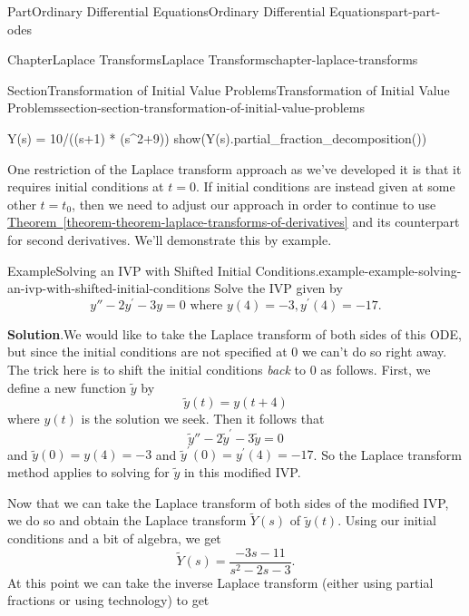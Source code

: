 \documentclass[twoside,10pt,]{book}
\newcommand{\blocktitlefont}{\relax}
\newcommand{\xreffont}{\relax}
\numberwithin{equation}{part}
\begin{document}
\begin{partptx}{Part}{Ordinary Differential Equations}{}{Ordinary Differential Equations}{}{}{part-part-odes}
\begin{chapterptx}{Chapter}{Laplace Transforms}{}{Laplace Transforms}{}{}{chapter-laplace-transforms}
\begin{sectionptx}{Section}{Transformation of Initial Value Problems}{}{Transformation of Initial Value Problems}{}{}{section-section-transformation-of-initial-value-problems}
\begin{sageinput}
Y(s) = 10/((s+1) * (s^2+9))
show(Y(s).partial_fraction_decomposition())
\end{sageinput}
One restriction of the Laplace transform approach as we've developed it is that it requires initial conditions at \(t=0\). If initial conditions are instead given at some other \(t=t_0\), then we need to adjust our approach in order to continue to use \hyperref[theorem-theorem-laplace-transforms-of-derivatives]{Theorem~{\xreffont\ref{theorem-theorem-laplace-transforms-of-derivatives}}} and its counterpart for second derivatives. We'll demonstrate this by example.%
\begin{example}{Example}{Solving an IVP with Shifted Initial Conditions.}{example-example-solving-an-ivp-with-shifted-initial-conditions}%
Solve the IVP given by%
\begin{equation*}
y'' - 2y^\prime - 3y = 0\text{ where }y(4) = -3, y^\prime(4) = -17.
\end{equation*}
%
\par\smallskip%
\noindent\textbf{\blocktitlefont Solution}.\hypertarget{solution-example-solving-an-ivp-with-shifted-initial-conditions-c}{}\quad{}We would like to take the Laplace transform of both sides of this ODE, but since the initial conditions are not specified at \(0\) we can't do so right away. The trick here is to shift the initial conditions \emph{back} to \(0\) as follows. First, we define a new function \(\widetilde{y}\) by%
\begin{equation*}
\widetilde{y}(t) = y(t+4)
\end{equation*}
where \(y(t)\) is the solution we seek. Then it follows that%
\begin{equation*}
\widetilde{y}'' - 2\widetilde{y}^\prime - 3\widetilde{y} = 0
\end{equation*}
and \(\widetilde{y}(0) = y(4) = -3\) and \(\widetilde{y}^\prime(0) = y^\prime(4) = -17\). So the Laplace transform method applies to solving for \(\widetilde{y}\) in this modified IVP.%
\par
Now that we can take the Laplace transform of both sides of the modified IVP, we do so and obtain the Laplace transform \(\widetilde{Y}(s)\) of \(\widetilde{y}(t)\). Using our initial conditions and a bit of algebra, we get%
\begin{equation*}
\widetilde{Y}(s) = \frac{-3s-11}{s^2-2s-3}.
\end{equation*}
At this point we can take the inverse Laplace transform (either using partial fractions or using technology) to get%
\begin{equation*}

\end{equation*}
\end{example}
\end{sectionptx}
\end{chapterptx}
\end{partptx}
\end{document}
